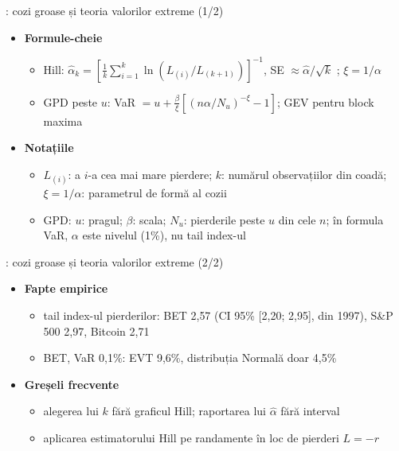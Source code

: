\begin{frame}{: cozi groase și teoria valorilor extreme (1/2)}
\itemsize{\small}
\begin{itemize}
    \item \textbf{Formule-cheie}
    \begin{itemize}
        \item Hill: $\hat\alpha_k = [\frac1k\sum_{i=1}^k \ln(L_{(i)}/L_{(k+1)})]^{-1}$, SE $\approx \hat\alpha/\sqrt{k}$ ; $\xi = 1/\alpha$
        \item GPD peste $u$: VaR $= u + \frac{\beta}{\xi}[(n\alpha/N_u)^{-\xi} - 1]$; GEV pentru block maxima
    \end{itemize}
    \item \textbf{Notațiile}
    \begin{itemize}
        \item $L_{(i)}$: a $i$-a cea mai mare pierdere; $k$: numărul observațiilor din coadă; $\xi = 1/\alpha$: parametrul de formă al cozii
        \item GPD: $u$: pragul; $\beta$: scala; $N_u$: pierderile peste $u$ din cele $n$; în formula VaR, $\alpha$ este nivelul (1\%), nu tail index-ul
    \end{itemize}
\end{itemize}
\end{frame}

\begin{frame}{: cozi groase și teoria valorilor extreme (2/2)}
\itemsize{\small}
\begin{itemize}
    \item \textbf{Fapte empirice}
    \begin{itemize}
        \item tail index-ul pierderilor: BET 2{,}57 (CI 95\% [2{,}20; 2{,}95], din 1997), S\&P 500 2{,}97, Bitcoin 2{,}71
        \item BET, VaR 0,1\%: EVT 9{,}6\%, distribuția Normală doar 4{,}5\%
    \end{itemize}
    \item \textbf{Greșeli frecvente}
    \begin{itemize}
        \item alegerea lui $k$ fără graficul Hill; raportarea lui $\hat\alpha$ fără interval
        \item aplicarea estimatorului Hill pe randamente în loc de pierderi $L = -r$
    \end{itemize}
\end{itemize}
\end{frame}

